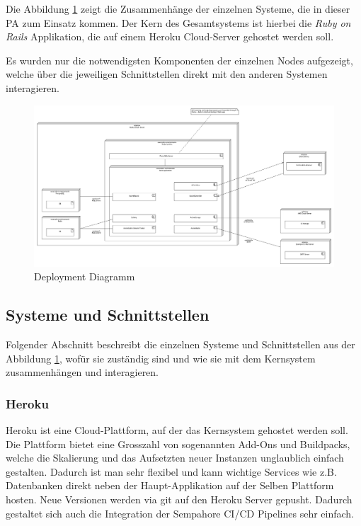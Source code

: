 Die Abbildung \ref{fig:deployment} zeigt die Zusammenhänge der einzelnen Systeme, die in dieser PA zum Einsatz kommen.
Der Kern des Gesamtsystems ist hierbei die \emph{Ruby on Rails} Applikation, die auf einem Heroku Cloud-Server gehostet werden soll.

Es wurden nur die notwendigsten Komponenten der einzelnen Nodes aufgezeigt, welche über die jeweiligen Schnittstellen direkt mit den anderen Systemen interagieren.

\begin{figure}[H]
    \centering
    \includegraphics[width=\textwidth]{images/diagrams/deployment.png}
    \caption{\label{fig:deployment}Deployment Diagramm}
\end{figure}

\subsection{Systeme und Schnittstellen}

Folgender Abschnitt beschreibt die einzelnen Systeme und Schnittstellen aus der Abbildung \ref{fig:deployment},
wofür sie zuständig sind und wie sie mit dem Kernsystem zusammenhängen und interagieren.

\subsubsection{Heroku}
Heroku ist eine Cloud-Plattform, auf der das Kernsystem gehostet werden soll. Die Plattform bietet eine
Grosszahl von sogenannten Add-Ons und Buildpacks, welche die Skalierung und das Aufsetzten neuer Instanzen unglaublich einfach gestalten.
Dadurch ist man sehr flexibel und kann wichtige Services wie z.B. Datenbanken direkt neben der Haupt-Applikation auf der Selben Plattform hosten.
Neue Versionen werden via git auf den Heroku Server gepusht. Dadurch gestaltet sich auch die Integration der Sempahore CI/CD Pipelines sehr einfach.

